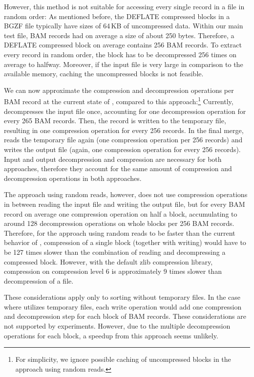 However, this method is not suitable for accessing every single record in a file in random order:
As mentioned before, the DEFLATE compressed blocks in a BGZF file typically have sizes of 64\,KB of uncompressed data. Within our main test file, BAM records had on average a size of about 250 bytes. Therefore, a DEFLATE compressed block on average contains 256 BAM records. To extract every record in random order, the block has to be decompressed 256 times on average to halfway. Moreover, if the input file is very large in comparison to the available memory, caching  the uncompressed blocks is not feasible. 

We can now approximate the compression and decompression operations per BAM record at the current state of \sort, compared to this approach:\footnote{For simplicity, we ignore possible caching of uncompressed blocks in the approach using random reads.} Currently, \sort decompresses the input file once, accounting for one decompression operation for every 265 BAM records. Then, the record is written to the temporary file, resulting in one compression operation for every 256 records. In the final merge, \sort reads the temporary file again (one compression operation per 256 records) and writes the output file (again, one compression operation for every 256 records). Input and output decompression and compression are necessary for both approaches, therefore they account for the same amount of compression and decompression operations in both approaches.

The approach using random reads, however, does not use compression operations in between reading the input file and writing the output file, but for every BAM record on average one compression operation on half a block, accumulating to around 128 decompression operations on whole blocks per 256 BAM records. Therefore, for the approach using random reads to be faster than the current behavior of \sort, compression of a single block (together with writing) would have to be 127 times slower than the combination of reading and decompressing a compressed block. However, with the default zlib compression library, compression on compression level 6 is approximately 9 times slower than decompression of a file. 

These considerations apply only to sorting without temporary files. In the case where \sort utilizes temporary files, each write operation would add one compression and decompression step for each block of BAM records. These considerations are not supported by experiments. However, due to the multiple decompression operations for each block, a speedup from this approach seems unlikely.

